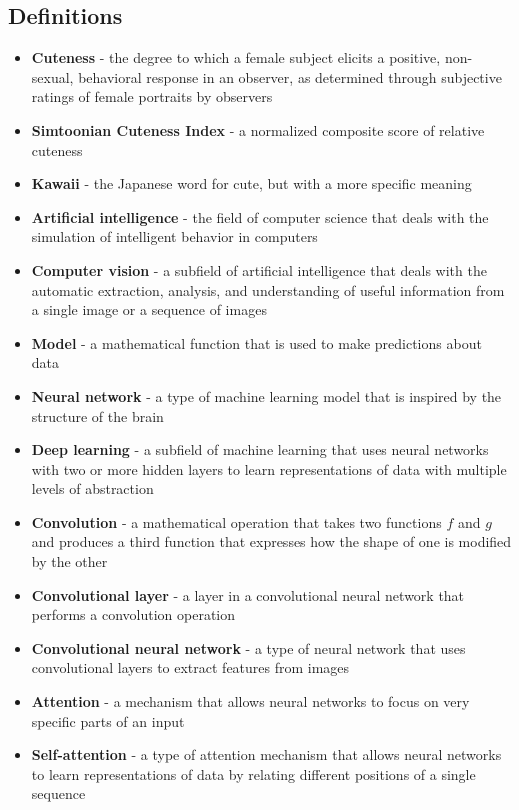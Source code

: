 \documentclass{article}
\begin{document}
\subsection{Definitions}
\begin{itemize}
    \item \textbf{Cuteness} - the degree to which a female subject elicits a positive, non-sexual, behavioral response in an observer, as determined through subjective ratings of female portraits by observers
    \item \textbf{Simtoonian Cuteness Index} - a normalized composite score of relative cuteness %
    \item \textbf{Kawaii} - the Japanese word for cute, but with a more specific meaning
    \item \textbf{Artificial intelligence} - the field of computer science that deals with the simulation of intelligent behavior in computers
    \item \textbf{Computer vision} - a subfield of artificial intelligence that deals with the automatic extraction, analysis, and understanding of useful information from a single image or a sequence of images
    \item \textbf{Model} - a mathematical function that is used to make predictions about data
    \item \textbf{Neural network} - a type of machine learning model that is inspired by the structure of the brain
    \item \textbf{Deep learning} - a subfield of machine learning that uses neural networks with two or more hidden layers to learn representations of data with multiple levels of abstraction
    \item \textbf{Convolution} - a mathematical operation that takes two functions $f$ and $g$ and produces a third function that expresses how the shape of one is modified by the other
    \item \textbf{Convolutional layer} - a layer in a convolutional neural network that performs a convolution operation
    \item \textbf{Convolutional neural network} - a type of neural network that uses convolutional layers to extract features from images
    \item \textbf{Attention} - a mechanism that allows neural networks to focus on very specific parts of an input
    \item \textbf{Self-attention} - a type of attention mechanism that allows neural networks to learn representations of data by relating different positions of a single sequence

\end{itemize}
\end{document}
